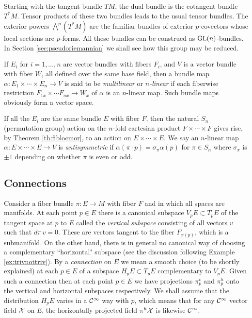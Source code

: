 \documentclass[12pt,titlepage]{article}
\def\cC{{\cal C}}
\def\cX{{\cal X}}
\def\GL{\hbox{GL}}
\begin{document}
Starting with the tangent bundle \(TM\), the dual bundle is the
cotangent bundle \(T^*M\). Tensor products of these two bundles leads to
the usual tensor bundles. The exterior powers \(\bigwedge^p(T^*M)\) are
the familiar bundles of exterior \(p\)-covectors whose local sections
are \(p\)-forms. All these bundles can be construed as \(\GL(n)\)-bundles. 
In Section \ref{sec:pseudoriemannian} we shall see how this group
may be reduced. 

If \(E_i\) for \(i=1,\dots,n\) are vector bundles with fibers \(F_i\),
and \(V\) is a vector bundle with fiber \(W\), all defined over the same
base field, then a  bundle map \(\alpha:E_1\times\cdots\times 
E_n \to V\) is
said to be {\em multilinear\/}
%
or {\em \(n\)-linear\/}
%
if each fiberwise restriction \(F_{1x}\times\cdots F_{nx}\to W_x\)
of \(\alpha\) 
is an \(n\)-linear map. Such bundle maps obviously form a vector space.

If all the \(E_i\) are the same bundle \(E\) with fiber \(F\), then the
natural  \(S_n\) (permutation group) action  on the
\(n\)-fold cartesian product \(F\times\cdots\times F\) gives rise,
by Theorem \ref{th:fiblocmor}, 
 to an
action on \(E\times\cdots\times E\). We say an \(n\)-linear map 
\(\alpha:E\times\cdots\times E \to V\) is {\em  antisymmetric\/}
%
if \(\alpha(\pi\cdot p) = \sigma_\pi \alpha(p)\) for \(\pi \in S_n\)
where \(\sigma_\pi\) is \(\pm 1\) depending on whether \(\pi\) is even
or odd.

\subsection{Connections}\label{sec:connect} 

Consider a fiber bundle  \(\pi:E \to M\) with fiber \(F\) and
in which all spaces are manifolds.
At each point \(p\in E\) there is a canonical subspace \(V_pE \subset
T_pE\)
% 
of the tangent space at \(p\) to \(E\) called the {\em vertical
subspace\/}
%
 consisting of all vectors \(v\) such that \(d\pi\,v = 0\).
These are vectors tangent to the fiber \(F_{\pi(p)}\), which is a
submanifold.
On the other
hand, there is in general no canonical way of choosing a complementary
``horizontal" subspace (see the discussion following
Example \ref{ex:trivnottriv}).  By a {\em connection\/}
%
 on \(E\) we mean a
smooth
choice (to be shortly explained) at each \(p\in E\)
of a subspace \(H_pE\subset T_pE\)
%
complementary to \(V_pE\).  Given such a connection then at each
point \(p\in E\) we have projections \(\pi^v_p\)
 and \(\pi^h_p\)
%
onto
the vertical and horizontal subspaces respectively. We shall assume
 that the distribution \(H_pE\) varies in
a \(\cC^\infty\) way with \(p\), which means that for any
\(\cC^\infty\) vector field \(\cX\) on \(E\), the horizontally projected
field
\(\pi^h\cX\) is likewise \(\cC^\infty\).
\end{document}
